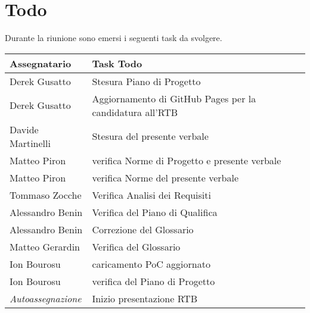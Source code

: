 \section{Todo}
Durante la riunione sono emersi i seguenti task da svolgere.

\begin{center}
  \begin{tabular}{|p{5cm}|p{8cm}|}
    \hline
    \textbf{Assegnatario}       & \textbf{Task Todo} \\ \hline
    Derek Gusatto & Stesura Piano di Progetto\\ \hline
     Derek Gusatto & Aggiornamento di GitHub Pages per la candidatura all'RTB \\ \hline
    Davide Martinelli & Stesura del presente verbale \\ \hline
    Matteo Piron & verifica Norme di Progetto e presente verbale \\ \hline
     Matteo Piron & verifica Norme del presente verbale \\ \hline
    Tommaso Zocche & Verifica Analisi dei Requisiti \\ \hline
    Alessandro Benin & Verifica del Piano di Qualifica \\ \hline
    Alessandro Benin & Correzione del Glossario \\ \hline
    Matteo Gerardin & Verifica del Glossario \\ \hline
    Ion Bourosu & caricamento PoC aggiornato \\ \hline
    Ion Bourosu & verifica del Piano di Progetto \\ \hline
    \textit{Autoassegnazione} & Inizio presentazione RTB \\ \hline
  \end{tabular}
\end{center}